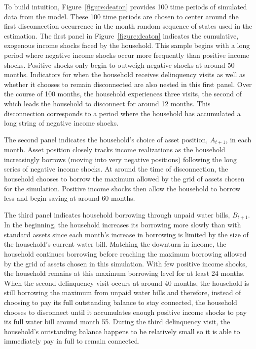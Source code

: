 \documentclass[12pt]{article}
\begin{document}
To build intuition, Figure~\ref{figure:deaton} provides 100 time periods of simulated data from the model.  These 100 time periods are chosen to center around the first disconnection occurrence in the month random sequence of states used in the estimation.  The first panel in Figure~\ref{figure:deaton} indicates the cumulative, exogenous income shocks faced by the household.  This sample begins with a long period where negative income shocks occur more frequently than positive income shocks.  Positive shocks only begin to outweigh negative shocks at around 50 months.  Indicators for when the household receives delinquency visits as well as whether it chooses to remain disconnected are also nested in this first panel.  Over the course of 100 months, the household experiences three visits, the second of which leads the household to disconnect for around 12 months.  This disconnection corresponds to a period where the household has accumulated a long string of negative income shocks.

The second panel indicates the household's choice of asset position, $A_{t+1}$, in each month.  Asset position closely tracks income realizations as the household increasingly borrows (moving into very negative positions) following the long series of negative income shocks.  At around the time of disconnection, the household chooses to borrow the maximum allowed by the grid of assets chosen for the simulation.  Positive income shocks then allow the household to borrow less and begin saving at around 60 months.

The third panel indicates household borrowing through unpaid water bills, $B_{t+1}$.  In the beginning, the household increases its borrowing more slowly than with standard assets since each month's increase in borrowing is limited by the size of the household's current water bill.  Matching the downturn in income, the household continues borrowing before reaching the maximum borrowing allowed by the grid of assets chosen in this simulation.  With few positive income shocks, the household remains at this maximum borrowing level for at least 24 months.  When the second delinquency visit occurs at around 40 months, the household is still borrowing the maximum from unpaid water bills and therefore, instead of choosing to pay its full outstanding balance to stay connected, the household chooses to disconnect until it accumulates enough positive income shocks to pay its full water bill around month 55.  During the third delinquency visit, the household's outstanding balance happens to be relatively small so it is able to immediately pay in full to remain connected.
\end{document}
